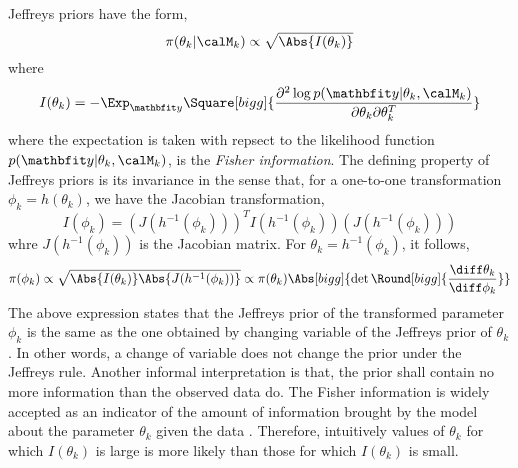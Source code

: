 Jeffreys priors \cite{Jeffreys:1946jf} have the form,
\begin{equation}
  \pi(\theta_k|\calM_k)\propto\sqrt{\Abs{I(\theta_k)}}
\end{equation}
where
\begin{equation}
  I(\theta_k)
  = -\Exp_{\data}\Square[bigg]{\frac{\partial^2\log p(\data|\theta_k,\calM_k)}
    {\partial\theta_k\partial\theta_k^T}}
\end{equation}
where the expectation is taken with repsect to the likelihood function
$p(\data|\theta_k,\calM_k)$, is the \emph{Fisher information}. The defining
property of Jeffreys priors is its invariance in the sense that, for a
one-to-one transformation $\phi_k = h(\theta_k)$, we have the Jacobian
transformation,
\begin{equation*}
  I(\phi_k) = (J(h^{-1}(\phi_k)))^T I(h^{-1}(\phi_k)) 
  (J(h^{-1}(\phi_k)))
\end{equation*}
whre $J(h^{-1}(\phi_k))$ is the Jacobian matrix. For $\theta_k =
h^{-1}(\phi_k)$, it follows,
\begin{equation*}
  \pi(\phi_k)
  \propto \sqrt{\Abs{I(\theta_k)}\Abs{J(h^{-1}(\phi_k))}}
  \propto \pi(\theta_k)
  \Abs[bigg]{\det\Round[bigg]{\frac{\diff\theta_k}{\diff\phi_k}}}
\end{equation*}
The above expression states that the Jeffreys prior of the transformed
parameter $\phi_k$ is the same as the one obtained by changing variable of
the Jeffreys prior of $\theta_k$. In other words, a change of variable does
not change the prior under the Jeffreys rule. Another informal interpretation
is that, the prior shall contain no more information than the observed data
do. The Fisher information is widely accepted as an indicator of the amount
of information brought by the model about the parameter $\theta_k$ given the
data \cite{Fisher:1956vx}. Therefore, intuitively values of $\theta_k$ for
which $I(\theta_k)$ is large is more likely than those for which
$I(\theta_k)$ is small.

